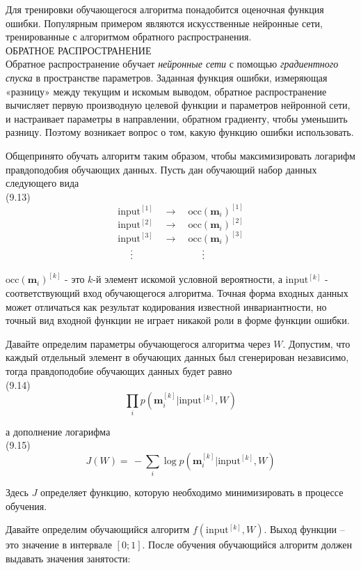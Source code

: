 \documentclass[10pt,a4paper]{article}
\begin{document}
Для тренировки обучающегося алгоритма понадобится оценочная функция ошибки. Популярным примером являются искусственные нейронные сети, тренированные с алгоритмом обратного распространения.\\
ОБРАТНОЕ РАСПРОСТРАНЕНИЕ\\
Обратное распространение обучает \textit{нейронные сети} с помощью \textit{градиентного спуска} в пространстве параметров. Заданная функция ошибки, измеряющая «разницу» между текущим и искомым выводом, обратное распространение вычисляет первую производную целевой функции и параметров нейронной сети, и настраивает параметры в направлении, обратном градиенту, чтобы уменьшить разницу. Поэтому возникает вопрос о том, какую функцию ошибки использовать.

Общепринято обучать алгоритм таким образом, чтобы максимизировать логарифм правдоподобия обучающих данных. Пусть дан обучающий набор данных следующего вида\\

(9.13)
$$\text{input}^{[1]}\quad\longrightarrow\quad\text{occ}(\textbf{m}_i)^{[1]}$$
$$\text{input}^{[2]}\quad\longrightarrow\quad\text{occ}(\textbf{m}_i)^{[2]}$$
$$\text{input}^{[3]}\quad\longrightarrow\quad\text{occ}(\textbf{m}_i)^{[3]}$$
$\hspace{45mm}\vdots\hspace{25mm}\vdots$

$\text{occ}(\textbf{m}_i)^{[k]}$ - это $k$-й элемент искомой условной вероятности, а $\text{input}^{[k]}$ - соответствующий вход обучающегося алгоритма. Точная форма входных данных может отличаться как результат кодирования известной инвариантности, но точный вид входной функции не играет никакой роли в форме функции ошибки.

Давайте определим параметры обучающегося алгоритма через $W$. Допустим, что каждый отдельный элемент в обучающих данных был сгенерирован независимо, тогда правдоподобие обучающих данных будет равно\\

(9.14)
$$\prod_i p(\textbf{m}_i^{[k]}|\text{input}^{[k]},W)$$

а дополнение логарифма\\

(9.15)
$$J(W)=\,-\sum_i \log p(\textbf{m}_i^{[k]}|\text{input}^{[k]},W)$$

Здесь $J$ определяет функцию, которую необходимо минимизировать в процессе обучения.

Давайте определим обучающийся алгоритм $f (\text{input}^{[k]},W)$. Выход функции – это значение в интервале $\left[ 0;1\right] $. После обучения обучающийся алгоритм должен выдавать значения занятости:\\
\end{document}
